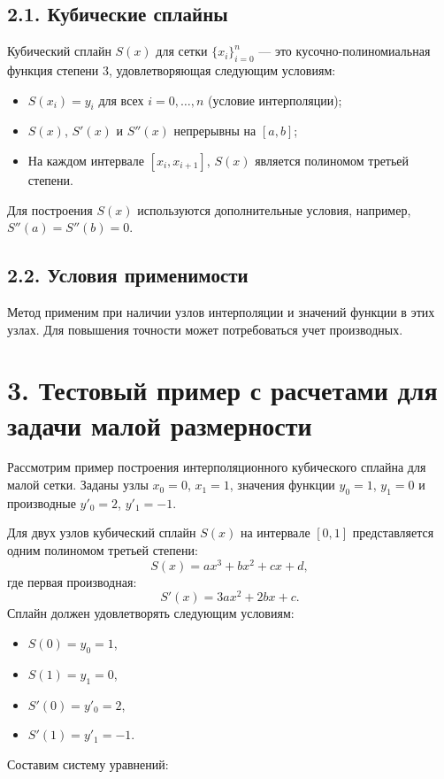 \documentclass[12pt]{article}
\begin{document}
\subsection*{2.1. Кубические сплайны}
Кубический сплайн \( S(x) \) для сетки \( \{x_i\}_{i=0}^n \) — это кусочно-полиномиальная функция степени 3, удовлетворяющая следующим условиям:
\begin{itemize}
    \item \( S(x_i) = y_i \) для всех \( i = 0, \dots, n \) (условие интерполяции);
    \item \( S(x) \), \( S'(x) \) и \( S''(x) \) непрерывны на \([a, b]\);
    \item На каждом интервале \([x_i, x_{i+1}]\), \( S(x) \) является полиномом третьей степени.
\end{itemize}
Для построения \( S(x) \) используются дополнительные условия, например, \( S''(a) = S''(b) = 0 \).

\subsection*{2.2. Условия применимости}
Метод применим при наличии узлов интерполяции и значений функции в этих узлах. Для повышения точности может потребоваться учет производных.


\section*{3. Тестовый пример с расчетами для задачи малой размерности}

Рассмотрим пример построения интерполяционного кубического сплайна для малой сетки. Заданы узлы \( x_0 = 0 \), \( x_1 = 1 \), значения функции \( y_0 = 1 \), \( y_1 = 0 \) и производные \( y'_0 = 2 \), \( y'_1 = -1 \).

Для двух узлов кубический сплайн \( S(x) \) на интервале \([0, 1]\) представляется одним полиномом третьей степени:
\[
S(x) = a x^3 + b x^2 + c x + d,
\]
где первая производная:
\[
S'(x) = 3a x^2 + 2b x + c.
\]
Сплайн должен удовлетворять следующим условиям:
\begin{itemize}
    \item \( S(0) = y_0 = 1 \),
    \item \( S(1) = y_1 = 0 \),
    \item \( S'(0) = y'_0 = 2 \),
    \item \( S'(1) = y'_1 = -1 \).
\end{itemize}

Составим систему уравнений:
\end{document}
